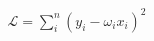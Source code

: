 \documentclass[preview]{standalone}
\begin{document}
\begin{align*}
\mathcal{L} = \sum_i^n (y_i-\omega_ix_i)^2
\end{align*}
\end{document}
